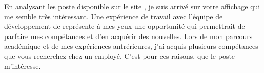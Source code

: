 \vfill
En analysant les poste disponible sur le site \BDemploi, je suis arrivé sur
votre affichage qui me semble très intéressant. Une expérience de travail
avec l'équipe de développement
de \Entreprise représente à mes yeux une opportunité qui permettrait de
parfaire mes compétances et d'en acquérir des nouvelles.
Lors de mon parcours académique et de mes expériences antrérieures, j'ai acquis
plusieurs compétances que vous recherchez chez un employé.
C'est pour ces raisons, que le poste \Poste m'intéresse.
